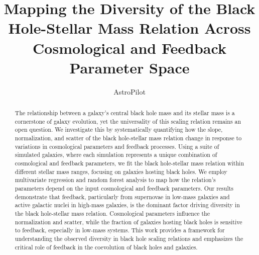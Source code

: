 \documentclass[twocolumn]{aastex631}
\begin{document}
\title{Mapping the Diversity of the Black Hole-Stellar Mass Relation Across Cosmological and Feedback Parameter Space}

\author{AstroPilot}

\begin{abstract}
The relationship between a galaxy's central black hole mass and its stellar mass is a cornerstone of galaxy evolution, yet the universality of this scaling relation remains an open question. We investigate this by systematically quantifying how the slope, normalization, and scatter of the black hole-stellar mass relation change in response to variations in cosmological parameters and feedback processes. Using a suite of simulated galaxies, where each simulation represents a unique combination of cosmological and feedback parameters, we fit the black hole-stellar mass relation within different stellar mass ranges, focusing on galaxies hosting black holes. We employ multivariate regression and random forest analysis to map how the relation's parameters depend on the input cosmological and feedback parameters. Our results demonstrate that feedback, particularly from supernovae in low-mass galaxies and active galactic nuclei in high-mass galaxies, is the dominant factor driving diversity in the black hole-stellar mass relation. Cosmological parameters influence the normalization and scatter, while the fraction of galaxies hosting black holes is sensitive to feedback, especially in low-mass systems. This work provides a framework for understanding the observed diversity in black hole scaling relations and emphasizes the critical role of feedback in the coevolution of black holes and galaxies.
\
\end{abstract}

\end{document}
